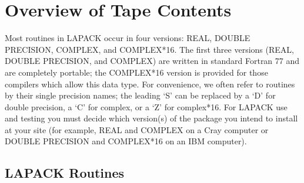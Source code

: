 \section{Overview of Tape Contents}\label{overview}

\dent
Most routines in LAPACK occur in four versions: REAL,
DOUBLE PRECISION, COMPLEX, and COMPLEX*16.
The first three versions (REAL, DOUBLE PRECISION, and COMPLEX)
are written in standard Fortran 77 and are completely portable;
the COMPLEX*16 version is provided for
those compilers which allow this data type.  
For convenience, we often refer to routines by their single precision
names; the leading `S' can be replaced by a `D' for double precision,
a `C' for complex, or a `Z' for complex*16.  
For LAPACK use and testing you must decide which version(s)
of the package you intend to install at your site (for example,
REAL and COMPLEX on a Cray computer or DOUBLE PRECISION and
COMPLEX*16 on an IBM computer).

\subsection{LAPACK Routines}

